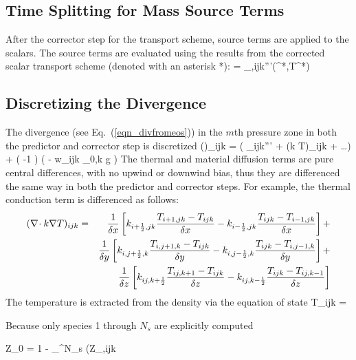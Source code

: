 \subsection{Time Splitting for Mass Source Terms}
\label{sec_time_splitting}
After the corrector step for the transport scheme, source terms are applied to the scalars.  The source terms are evaluated using the results from the corrected scalar transport scheme (denoted with an asterisk *):
\be
{} =  \dm_{\alpha,ijk}'''(^*,T^*)
\ee


\subsection{Discretizing the Divergence}
\label{div_discret}

The divergence (see Eq.~(\ref{eqn_divfromeos})) in the $m$th pressure zone in both the predictor and corrector step
is discretized
\be (\nabla\!\cdot \bu)_{ijk} =  \left( \dq_{ijk}''' + (\nabla\!\cdot k \nabla T)_{ijk}
    + \ldots \right) +  \left(  -1 \right)
      \left(  - w_{ijk} \rho_{0,k} g \right) \label{divdis} \ee
The thermal and material diffusion terms are pure central differences,
with no upwind or downwind bias, thus they are differenced the same
way in both the predictor and corrector steps. For example, the thermal
conduction term is differenced as follows:
\begin{eqnarray}
(\nabla\!\cdot k \nabla T)_{ijk} &=&
              \frac{1}{\delta x}
         \left[k_{i+\frac{1}{2},jk}\frac{T_{i+1,jk}-T_{ijk}}{\delta x}
              -k_{i-\frac{1}{2},jk}\frac{T_{ijk}-T_{i-1,jk}}{\delta x}\right]+  \nonumber \\
            &&\frac{1}{\delta y}
         \left[k_{i,j+\frac{1}{2},k}\frac{T_{i,j+1,k}-T_{ijk}}{\delta y}
              -k_{i,j-\frac{1}{2},k}\frac{T_{ijk}-T_{i,j-1,k}}{\delta y}\right]+ \nonumber \\
            &&\frac{1}{\delta z}
         \left[k_{ij,k+\frac{1}{2}}\frac{T_{ij,k+1}-T_{ijk}}{\delta z}
              -k_{ij,k-\frac{1}{2}}\frac{T_{ijk}-T_{ij,k-1}}{\delta z}\right]
\end{eqnarray}
The temperature is extracted from the density via the equation of state
\be T_{ijk} = \ee

Because only species 1 through $N_s$ are explicitly computed

\be Z_0 =  1 -  \sum_{}^{N_s} (Z_{\alpha,ijk} \ee

